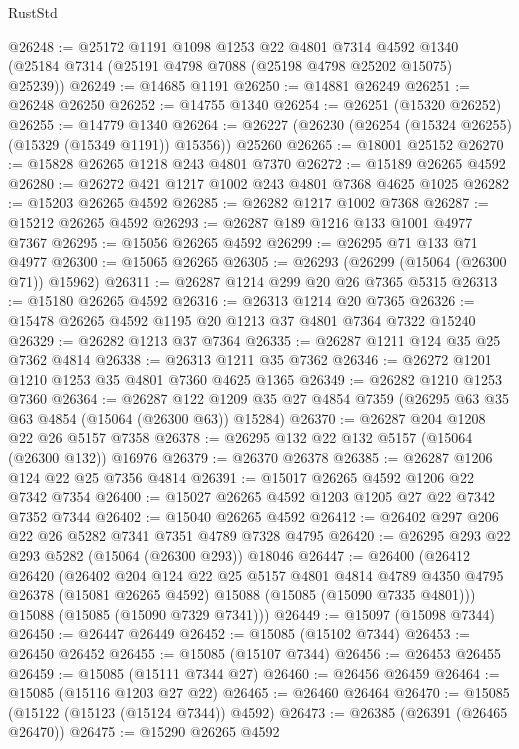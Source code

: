 \begin{lexlean}{RustStd}
\begin{coremodule}
@26248 := @25172
    @1191
    @1098
    @1253
    @22
    @4801
    @7314
    @4592
    @1340
    (@25184 @7314 (@25191 @4798 @7088 (@25198 @4798 @25202 @15075) @25239))
@26249 := @14685 @1191
@26250 := @14881 @26249
@26251 := @26248 @26250
@26252 := @14755 @1340
@26254 := @26251 (@15320 @26252)
@26255 := @14779 @1340
@26264 := @26227 (@26230 (@26254 (@15324 @26255) (@15329 (@15349 @1191)) @15356)) @25260
@26265 := @18001 @25152
@26270 := @15828 @26265 @1218 @243 @4801 @7370
@26272 := @15189 @26265 @4592
@26280 := @26272 @421 @1217 @1002 @243 @4801 @7368 @4625 @1025
@26282 := @15203 @26265 @4592
@26285 := @26282 @1217 @1002 @7368
@26287 := @15212 @26265 @4592
@26293 := @26287 @189 @1216 @133 @1001 @4977 @7367
@26295 := @15056 @26265 @4592
@26299 := @26295 @71 @133 @71 @4977
@26300 := @15065 @26265
@26305 := @26293 (@26299 (@15064 (@26300 @71)) @15962)
@26311 := @26287 @1214 @299 @20 @26 @7365 @5315
@26313 := @15180 @26265 @4592
@26316 := @26313 @1214 @20 @7365
@26326 := @15478 @26265 @4592 @1195 @20 @1213 @37 @4801 @7364 @7322 @15240
@26329 := @26282 @1213 @37 @7364
@26335 := @26287 @1211 @124 @35 @25 @7362 @4814
@26338 := @26313 @1211 @35 @7362
@26346 := @26272 @1201 @1210 @1253 @35 @4801 @7360 @4625 @1365
@26349 := @26282 @1210 @1253 @7360
@26364 := @26287
    @122
    @1209
    @35
    @27
    @4854
    @7359
    (@26295 @63 @35 @63 @4854 (@15064 (@26300 @63)) @15284)
@26370 := @26287 @204 @1208 @22 @26 @5157 @7358
@26378 := @26295 @132 @22 @132 @5157 (@15064 (@26300 @132)) @16976
@26379 := @26370 @26378
@26385 := @26287 @1206 @124 @22 @25 @7356 @4814
@26391 := @15017 @26265 @4592 @1206 @22 @7342 @7354
@26400 := @15027 @26265 @4592 @1203 @1205 @27 @22 @7342 @7352 @7344
@26402 := @15040 @26265 @4592
@26412 := @26402 @297 @206 @22 @26 @5282 @7341 @7351 @4789 @7328 @4795
@26420 := @26295 @293 @22 @293 @5282 (@15064 (@26300 @293)) @18046
@26447 := @26400
    (@26412
      @26420
      (@26402
        @204
        @124
        @22
        @25
        @5157
        @4801
        @4814
        @4789
        @4350
        @4795
        @26378
        (@15081 @26265 @4592)
        @15088
        (@15085 (@15090 @7335 @4801)))
      @15088
      (@15085 (@15090 @7329 @7341)))
@26449 := @15097 (@15098 @7344)
@26450 := @26447 @26449
@26452 := @15085 (@15102 @7344)
@26453 := @26450 @26452
@26455 := @15085 (@15107 @7344)
@26456 := @26453 @26455
@26459 := @15085 (@15111 @7344 @27)
@26460 := @26456 @26459
@26464 := @15085 (@15116 @1203 @27 @22)
@26465 := @26460 @26464
@26470 := @15085 (@15122 (@15123 (@15124 @7344)) @4592)
@26473 := @26385 (@26391 (@26465 @26470))
@26475 := @15290 @26265 @4592

\end{coremodule}
\end{lexlean}
